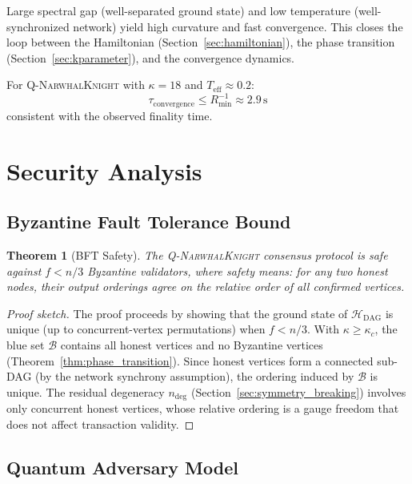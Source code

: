 \documentclass[12pt,a4paper,twocolumn]{article}
\newtheorem{theorem}{Theorem}
\newcommand{\qnk}{\textsc{Q-NarwhalKnight}}
\newcommand{\Hdag}{\mathcal{H}_{\mathrm{DAG}}}
\newcommand{\kparam}{\kappa}
\newcommand{\Teff}{T_{\mathrm{eff}}}
\begin{document}
Large spectral gap (well-separated ground state) and low temperature (well-synchronized network) yield high curvature and fast convergence. This closes the loop between the Hamiltonian (Section~\ref{sec:hamiltonian}), the phase transition (Section~\ref{sec:kparameter}), and the convergence dynamics.

For \qnk{} with $\kparam = 18$ and $\Teff \approx 0.2$:
\begin{equation}
\tau_{\mathrm{convergence}} \leq R_{\min}^{-1} \approx 2.9\,\text{s}
\end{equation}
consistent with the observed finality time.

\section{Security Analysis}
\label{sec:security}

\subsection{Byzantine Fault Tolerance Bound}

\begin{theorem}[BFT Safety]
The \qnk{} consensus protocol is safe against $f < n/3$ Byzantine validators, where safety means: for any two honest nodes, their output orderings agree on the relative order of all confirmed vertices.
\end{theorem}

\begin{proof}[Proof sketch]
The proof proceeds by showing that the ground state of $\Hdag$ is unique (up to concurrent-vertex permutations) when $f < n/3$. With $\kparam \geq \kparam_c$, the blue set $\mathcal{B}$ contains all honest vertices and no Byzantine vertices (Theorem~\ref{thm:phase_transition}). Since honest vertices form a connected sub-DAG (by the network synchrony assumption), the ordering induced by $\mathcal{B}$ is unique. The residual degeneracy $n_{\mathrm{deg}}$ (Section~\ref{sec:symmetry_breaking}) involves only concurrent honest vertices, whose relative ordering is a gauge freedom that does not affect transaction validity.
\end{proof}

\subsection{Quantum Adversary Model}
\end{document}
